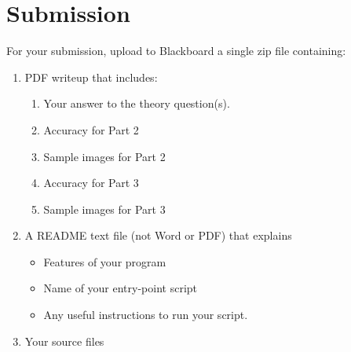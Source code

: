 \documentclass[12pt]{article}
\begin{document}
\newpage
\section*{Submission}
For your submission, upload to Blackboard a single zip file containing:

\begin{enumerate}
\item PDF writeup that includes:
\begin{enumerate}
\item Your answer to the theory question(s).
\item Accuracy for Part 2
\item Sample images for Part 2
\item Accuracy for Part 3
\item Sample images for Part 3
\end{enumerate}
\item A README text file (not Word or PDF) that explains
\begin{itemize}
\item Features of your program
\item Name of your entry-point script
\item Any useful instructions to run your script.
\end{itemize}
\item Your source files
\end{enumerate}
\end{document}
